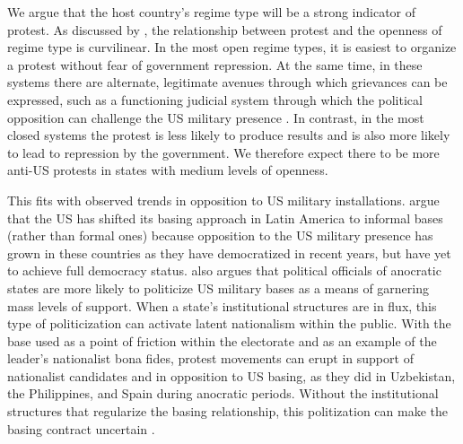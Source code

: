 We argue that the host country's regime type will be a strong indicator of protest. As discussed by , the relationship between protest and the openness of regime type is curvilinear.  In the most open regime types, it is easiest to organize a protest without fear of government repression.  At the same time, in these systems there are alternate, legitimate avenues through which grievances can be expressed, such as a functioning judicial system through which the political opposition can challenge the US military presence \cite{Bitar2016}. In contrast, in the most closed systems the protest is less likely to produce results and is also more likely to lead to repression by the government. We therefore expect there to be more anti-US protests in states with medium levels of openness.

This fits with observed trends in opposition to US military installations.  argue that the US has shifted its basing approach in Latin America to informal bases (rather than formal ones) because opposition to the US military presence has grown in these countries as they have democratized in recent years, but have yet to achieve full democracy status.  also argues that political officials of anocratic states are more likely to politicize US military bases as a means of garnering mass levels of support. When a state's institutional structures are in flux, this type of politicization can activate latent nationalism within the public. With the base used as a point of friction within the electorate and as an example of the leader's nationalist bona fides, protest movements can erupt in support of nationalist candidates and in opposition to US basing, as they did in Uzbekistan, the Philippines, and Spain during anocratic periods. Without the institutional structures that regularize the basing relationship, this politization can make the basing contract uncertain \cite{stravers2018}. 


